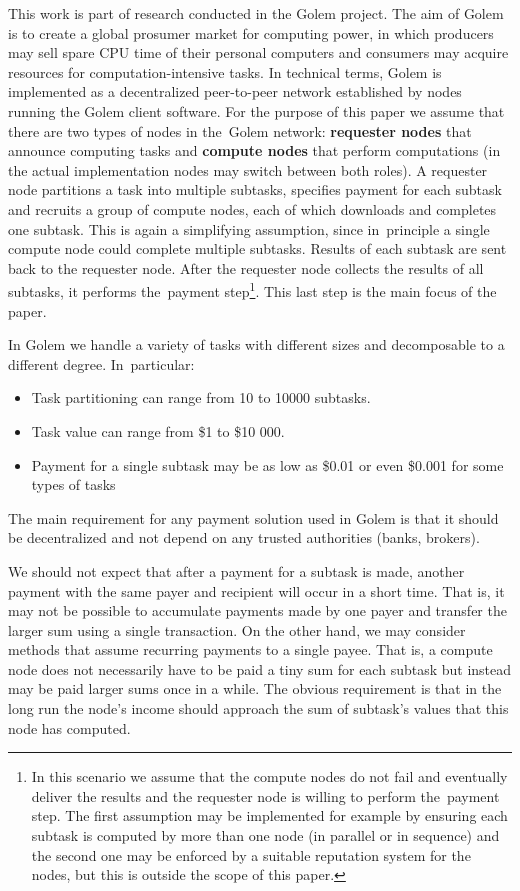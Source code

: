 \documentclass[a4paper]{article}
\begin{document}
    This work is part of research conducted in the Golem project. The aim of Golem is to create a global prosumer
    market for computing power, in which producers may sell spare CPU time of their personal computers and consumers
    may acquire resources for computation-intensive tasks. In technical terms, Golem is implemented as a decentralized
    peer-to-peer network established by nodes running the Golem client software. For the purpose of this paper
    we assume that there are two types of nodes in the~Golem network: \textbf{requester nodes} that announce computing
    tasks and \textbf{compute nodes} that perform computations (in the actual implementation nodes may switch between
    both roles).
    A requester node partitions a task into multiple subtasks, specifies payment for each subtask and recruits
    a group of compute nodes, each of which downloads and completes one subtask. This is again a simplifying
    assumption, since in~principle a single compute node could complete multiple subtasks.
    Results of each subtask are sent back to the requester node. After the requester node collects the results of all
    subtasks, it performs the~payment step\footnote{In this scenario we assume that the compute nodes do not fail
    and eventually deliver the results and the requester node is willing to perform the~payment step.
    The first assumption may be implemented for example by ensuring each subtask is computed by more than one node
    (in parallel or in sequence) and the second one may be enforced by a suitable reputation system for the nodes,
    but this is outside the scope of this paper.}. This last step is the main focus of the paper.

    In Golem we handle a variety of tasks with different sizes and decomposable to a different degree. In~particular:
    \begin{itemize}
        \item Task partitioning can range from 10 to 10000 subtasks.
        \item Task value can range from \$1 to \$10 000.
        \item Payment for a single subtask may be as low as \$0.01 or even \$0.001 for some types of tasks
    \end{itemize}

    The main requirement for any payment solution used in Golem is that it should be decentralized and not depend
    on any trusted authorities (banks, brokers).


    We should not expect that after a payment for a subtask is made, another payment with the same payer and recipient
    will occur in a short time. That is, it may not be possible to accumulate payments made by one payer and transfer
    the larger sum using a single transaction. On the other hand, we may consider methods that assume recurring
    payments to a single payee. That is, a compute node does not necessarily have to be paid a tiny sum for each
    subtask but instead may be paid larger sums once in a while. The obvious requirement is that in the long run
    the node's income should approach the sum of subtask’s values that this node has computed.
\end{document}
